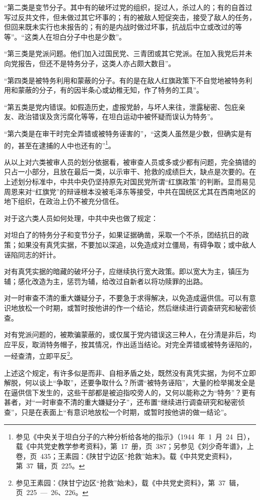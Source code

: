 “第二类是变节分子。其中有的破坏过党的组织，捉过人，杀过人的；有的自首过写过反共文件，但未做过其它坏事的；有的被敌人短促突击，接受了敌人的任务，但回来既未实行也未报告的；有的是内战时做过坏事，抗战后中立或改过的等等”。“这类人在坦白分子中也是少数”。

“第三类是党派问题。他们加入过国民党、三青团或其它党派。在加入我党后并未向党报告，但还不是特务分子，这类人亦占颇大数目”。

“第四类是被特务利用和蒙蔽的分子。有的是在敌人红旗政策下不自觉地被特务利用和蒙蔽的分子，有的因半条心或幼稚无知，作了特务的工具”。

“第五类是党内错误。如假造历史，虚报党龄，与坏人来往，泄露秘密、包庇亲友、政治错误及贪污腐化等等，在坦白运动中被怀疑而误认为特务”。

“第六类是在审干时完全弄错或被特务诬害的”，“这类人虽然是少数，但确实是有的，甚至在逮捕的人中也还有的”\footnote{参见《中央关于坦白分子的六种分析给各地的指示》（1944~年~1~月~24~日），载《中共党史教学参考资料》，第~17~册，页~387；另参见《刘少奇年谱》，上卷，页~435；王素园：《陕甘宁边区“抢救”始末》。载《中共党史资料》，第~37~辑，页~225。}。

从以上对六类被审人员的划分依据看，被审查人员或多或少都有问题，完全搞错的只占一小部分，且放在最后一类，以示审干、抢救的成绩巨大，缺点是次要的。在上述划分标准中，中共中央仍坚持原先对国民党所谓“红旗政策”的判断。显而易见周恩来对“红旗党”的辩诬根本没被毛泽东等接受，中共在国统区尤其在西南地区的地下组织，在政治上仍不被充分信任。

对于这六类人员如何处理，中共中央也做了规定：

对坦白了的特务分子和变节分子，如果证据确凿，采取一个不杀，团结抗日的政策；如果没有真凭实据，不要加以深追，以免造成对立僵局，有碍争取；或中敌人诬陷同志的奸计。

对有真凭实据的暗藏的破坏分子，应继续执行宽大政策。即以宽大为主，镇压为辅；感化改造为主，惩罚为辅，给改过自新者以将功赎罪的出路。

对一时审查不清的重大嫌疑分子，不要急于求得解决，以免造成逼供信。可以有意识地放松一个时期，或暂时按他讲的作一个结论，然后继续进行调查研究和秘密侦查。

对有党派问题的，被欺骗蒙蔽的，或仅属于党内错误这三种人，在分清是非后，均应平反，取消特务帽子，按其情况，作出适当结论。对完全弄错或被特务诬陷的，一经查清，立即平反\footnote{参见王素园：《陕甘宁边区“抢救”始未》，载《中共党史资料》，第~37~辑，页~225~—~26、226。}。

上述这个规定，有许多似是而非、自相矛盾之处，既然没有真凭实据，为何不立即解脱，何以谈上“争取”，还要争取什么？所谓“被特务诬陷”，大量的检举揭发全是在逼供信下发生的，这些干部都是被迫指咬旁人的，又何以能称之为“特务”？更有甚者，对“一时审查不清的重大嫌疑分子”，还布置“继续进行调查研究和秘密侦查”，只是在表面上“有意识地放松一个时期，或暂时按他讲的做一结论”。

